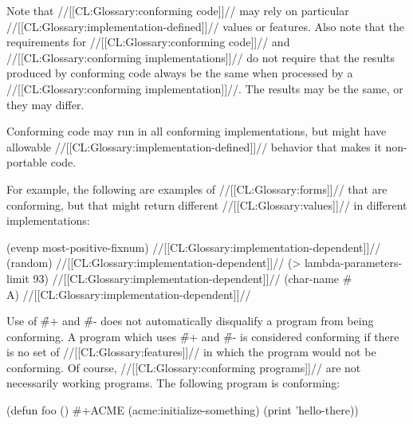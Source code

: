 
Note that //[[CL:Glossary:conforming code]]// may rely on particular
//[[CL:Glossary:implementation-defined]]// values or features. Also note that the
requirements for //[[CL:Glossary:conforming code]]// and //[[CL:Glossary:conforming implementations]]// do not
require that the results produced by conforming code always be the
same when processed by a //[[CL:Glossary:conforming implementation]]//. The results may be the
same, or they may differ.





















 
Conforming code may run in all conforming implementations, but might
have allowable //[[CL:Glossary:implementation-defined]]// behavior that makes it
non-portable code.

For example, the following are examples of //[[CL:Glossary:forms]]// that are conforming, but
that might return different //[[CL:Glossary:values]]// in different implementations:

\code
 (evenp most-positive-fixnum) \EV //[[CL:Glossary:implementation-dependent]]//
 (random) \EV //[[CL:Glossary:implementation-dependent]]//
 (> lambda-parameters-limit 93) \EV //[[CL:Glossary:implementation-dependent]]//
 (char-name #\\A) \EV //[[CL:Glossary:implementation-dependent]]//
\endcode 






Use of \f{\#+} and \f{\#-} does not automatically disqualify a program
from being conforming.  A program which uses \f{\#+} and \f{\#-} is 
considered conforming if there is no set of //[[CL:Glossary:features]]// in which the
program would not be conforming.  Of course, //[[CL:Glossary:conforming programs]]// are
not necessarily working programs.  The following program is conforming:

\code
(defun foo ()
  \#+ACME (acme:initialize-something)
  (print 'hello-there))
\endcode


